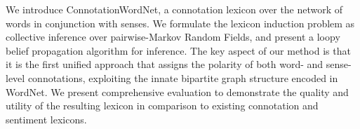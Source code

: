 We introduce ConnotationWordNet, a connotation lexicon over the network of words in conjunction with senses. We formulate the lexicon induction problem as collective inference over pairwise-Markov Random Fields, and present a loopy belief propagation algorithm for inference. The key aspect of our method is that it is the first unified approach that assigns the polarity of both word- and sense-level connotations, exploiting the innate bipartite graph structure encoded in WordNet. We present comprehensive evaluation to demonstrate the quality and utility of the resulting lexicon in comparison to existing connotation and sentiment lexicons.
